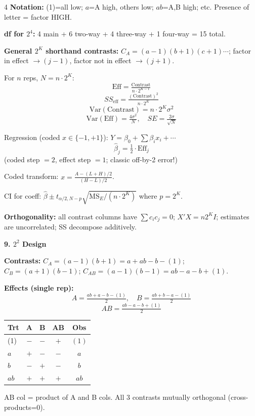 \documentclass[7pt,letterpaper,landscape]{extarticle}
\newcommand{\secbar}[1]{%
  \vspace{2pt}%
  {\colorbox{black!80}{\parbox{\dimexpr\linewidth-2\fboxsep}{\color{white}\small\bfseries #1}}}\par%
  \vspace{1pt}%
}
\newcommand{\MSE}{\mathrm{MS}_E}
\begin{document}
\begin{multicols*}{4}
\textbf{Notation:} (1)=all low; $a$=A high, others low; $ab$=A,B high; etc. Presence of letter = factor HIGH.

\textbf{df for $2^4$:} 4 main + 6 two-way + 4 three-way + 1 four-way = 15 total.

\textbf{General $2^K$ shorthand contrasts:}
$C_A{=}(a{-}1)(b{+}1)(c{+}1)\cdots$; factor in effect $\to(j{-}1)$, factor not in effect $\to(j{+}1)$.

For $n$ reps, $N{=}n\cdot 2^K$:
\[\boxed{\text{Eff}{=}\tfrac{\text{Contrast}}{n\cdot 2^{K-1}}}\]
\[\boxed{SS_{\text{eff}}{=}\tfrac{(\text{Contrast})^2}{n\cdot 2^K}}\]
\[\mathrm{Var}(\text{Contrast}){=}n\cdot 2^K\sigma^2\]
\[\mathrm{Var}(\text{Eff}){=}\tfrac{4\sigma^2}{N},\quad SE{=}\tfrac{2\sigma}{\sqrt N}\]

Regression (coded $x\in\{-1,+1\}$): $Y{=}\beta_0{+}\sum\beta_ix_i{+}\cdots$
\[\boxed{\hat\beta_j{=}\tfrac12\cdot\text{Eff}_j}\]
(coded step $=2$, effect step $=1$; classic off-by-2 error!)

Coded transform: $x{=}\tfrac{A-(L+H)/2}{(H-L)/2}$.

CI for coeff: $\hat\beta{\pm}t_{\alpha/2,N-p}\sqrt{\MSE/(n\cdot2^K)}$ where $p{=}2^K$.

\textbf{Orthogonality:} all contrast columns have $\sum c_i c_j{=}0$; $X'X{=}n2^K I$; estimates are uncorrelated; SS decompose additively.

\secbar{9. $2^2$ Design}
\textbf{Contrasts:} $C_A{=}(a{-}1)(b{+}1){=}a{+}ab{-}b{-}(1)$; $C_B{=}(a{+}1)(b{-}1)$; $C_{AB}{=}(a{-}1)(b{-}1){=}ab{-}a{-}b{+}(1)$.

\textbf{Effects (single rep):}
\[A{=}\tfrac{ab+a-b-(1)}{2},\quad B{=}\tfrac{ab+b-a-(1)}{2}\]
\[AB{=}\tfrac{ab-a-b+(1)}{2}\]

{\scriptsize
\begin{tabular}{@{}lcccc@{}}
\toprule
Trt & A & B & AB & Obs\\
\midrule
(1) & $-$ & $-$ & $+$ & $(1)$\\
$a$ & $+$ & $-$ & $-$ & $a$\\
$b$ & $-$ & $+$ & $-$ & $b$\\
$ab$ & $+$ & $+$ & $+$ & $ab$\\
\bottomrule
\end{tabular}\par}

AB col = product of A and B cols. All 3 contrasts mutually orthogonal (cross-products=0).


\end{multicols*}
\end{document}
